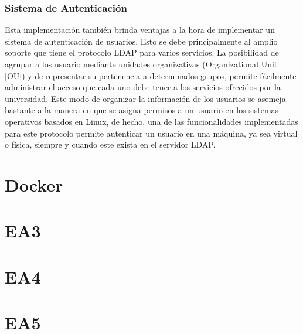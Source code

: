\subsubsection{Sistema de Autenticaci\'on}
Esta implementaci\'on tambi\'en brinda ventajas a la hora de implementar un sistema de autenticaci\'on de usuarios. Esto se debe principalmente al amplio soporte que tiene el protocolo LDAP para varios servicios. La posibilidad de agrupar a los usuario mediante unidades organizativas (Organizational Unit [OU]) y de representar su pertenencia a determinados grupos, permite f\'acilmente administrar el acceso que cada uno debe tener a los servicios ofrecidos por la universidad. Este modo de organizar la informaci\'on de los usuarios se asemeja bastante a la manera en que se asigna permisos a un usuario en los sistemas operativos basados en Linux, de hecho, una de las funcionalidades implementadas para este protocolo permite autenticar un usuario en una m\'aquina, ya sea virtual o f\'isica, siempre y cuando este exista en el servidor LDAP.


\section{Docker}
\section{EA3}
\section{EA4}
\section{EA5}
